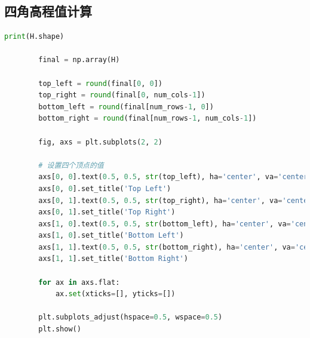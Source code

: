 \documentclass[a4paper]{article}
\begin{document}
	\subsection{四角高程值计算}
	\begin{lstlisting}[language=python,columns=fullflexible,frame=shadowbox]
		print(H.shape)

		final = np.array(H)

		top_left = round(final[0, 0])
		top_right = round(final[0, num_cols-1])
		bottom_left = round(final[num_rows-1, 0])
		bottom_right = round(final[num_rows-1, num_cols-1])
		
		fig, axs = plt.subplots(2, 2)
		
		# 设置四个顶点的值
		axs[0, 0].text(0.5, 0.5, str(top_left), ha='center', va='center', size=20)
		axs[0, 0].set_title('Top Left')
		axs[0, 1].text(0.5, 0.5, str(top_right), ha='center', va='center', size=20)
		axs[0, 1].set_title('Top Right')
		axs[1, 0].text(0.5, 0.5, str(bottom_left), ha='center', va='center', size=20)
		axs[1, 0].set_title('Bottom Left')
		axs[1, 1].text(0.5, 0.5, str(bottom_right), ha='center', va='center', size=20)
		axs[1, 1].set_title('Bottom Right')
		
		for ax in axs.flat:
			ax.set(xticks=[], yticks=[])
		
		plt.subplots_adjust(hspace=0.5, wspace=0.5)	
		plt.show()		
	\end{lstlisting}
\end{document}
